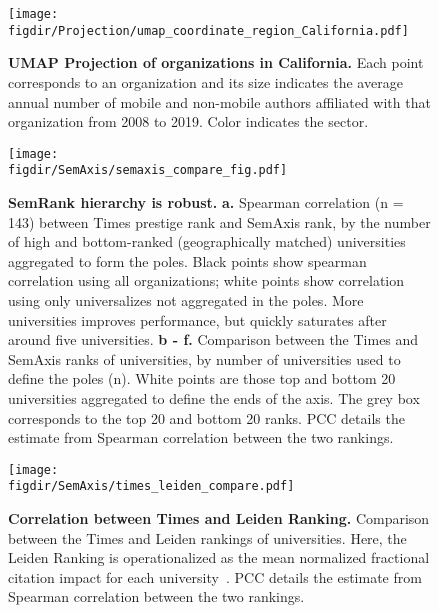 \documentclass[12pt]{article} %
\def\figdir{../Figs}
\begin{document}
%
%
\begin{figure}[hp!]
	\centering
	\texttt{[image: \\figdir/Projection/umap\_coordinate\_region\_California.pdf]}
	\caption{
		\textbf{UMAP Projection of organizations in California.}
		Each point corresponds to an organization and its size indicates the average annual number of mobile and non-mobile authors affiliated with that organization from 2008 to 2019. 
		Color indicates the sector. 
	}
	\label{fig:supp:proj_california}
\end{figure}




%
%
\begin{figure}[hp!]
	\centering
	\texttt{[image: \\figdir/SemAxis/semaxis\_compare\_fig.pdf]}
	\caption{
		\textbf{SemRank hierarchy is robust.}
		\textbf{a.} Spearman correlation (n = 143) between Times prestige rank and SemAxis rank, by the number of high and bottom-ranked (geographically matched) universities aggregated to form the poles.
		Black points show spearman correlation using all organizations; white points show correlation using only universalizes not aggregated in the poles. 
		More universities improves performance, but quickly saturates after around five universities.
		\textbf{b - f.} Comparison between the Times and SemAxis ranks of universities, by number of universities used to define the poles (n).
		White points are those top and bottom 20 universities aggregated to define the ends of the axis.
		The grey box corresponds to the top 20 and bottom 20 ranks.
	  	PCC details the estimate from Spearman correlation between the two rankings.
	}
	\label{fig:supp:semaxis_compare}
\end{figure}


%
%
\begin{figure}[hp!]
	\centering
	\texttt{[image: \\figdir/SemAxis/times\_leiden\_compare.pdf]}
	\caption{
		\textbf{Correlation between Times and Leiden Ranking.}
		Comparison between the Times and Leiden rankings of universities.
		Here, the Leiden Ranking is operationalized as the mean normalized fractional citation impact for each university~\autocite{waltman2012leidenrankings}. 
	  	PCC details the estimate from Spearman correlation between the two rankings.
	}
	\label{fig:supp:times_vs_leiden}
\end{figure}
\end{document}
